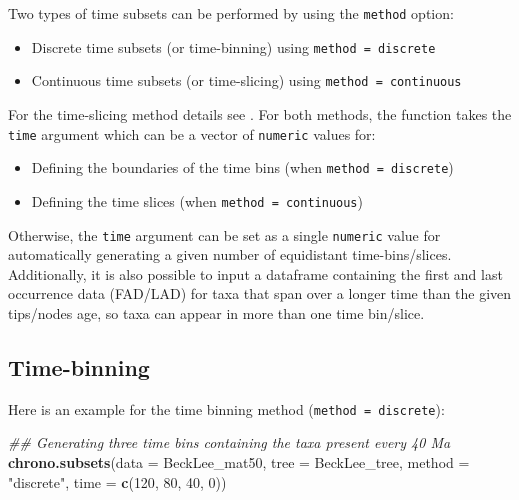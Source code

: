 \documentclass[]{book}
\newenvironment{Shaded}{\begin{snugshade}}{\end{snugshade}}
\newcommand{\CommentTok}[1]{\textcolor[rgb]{0.56,0.35,0.01}{\textit{#1}}}
\newcommand{\DataTypeTok}[1]{\textcolor[rgb]{0.13,0.29,0.53}{#1}}
\newcommand{\DecValTok}[1]{\textcolor[rgb]{0.00,0.00,0.81}{#1}}
\newcommand{\KeywordTok}[1]{\textcolor[rgb]{0.13,0.29,0.53}{\textbf{#1}}}
\newcommand{\NormalTok}[1]{#1}
\newcommand{\StringTok}[1]{\textcolor[rgb]{0.31,0.60,0.02}{#1}}
\providecommand{\tightlist}{%
  \setlength{\itemsep}{0pt}\setlength{\parskip}{0pt}}
\begin{document}
Two types of time subsets can be performed by using the \texttt{method} option:

\begin{itemize}
\tightlist
\item
  Discrete time subsets (or time-binning) using \texttt{method\ =\ discrete}
\item
  Continuous time subsets (or time-slicing) using \texttt{method\ =\ continuous}
\end{itemize}

For the time-slicing method details see \citet{time-slice}.
For both methods, the function takes the \texttt{time} argument which can be a vector of \texttt{numeric} values for:

\begin{itemize}
\tightlist
\item
  Defining the boundaries of the time bins (when \texttt{method\ =\ discrete})
\item
  Defining the time slices (when \texttt{method\ =\ continuous})
\end{itemize}

Otherwise, the \texttt{time} argument can be set as a single \texttt{numeric} value for automatically generating a given number of equidistant time-bins/slices.
Additionally, it is also possible to input a dataframe containing the first and last occurrence data (FAD/LAD) for taxa that span over a longer time than the given tips/nodes age, so taxa can appear in more than one time bin/slice.

\hypertarget{time-binning}{%
\subsection{Time-binning}\label{time-binning}}

Here is an example for the time binning method (\texttt{method\ =\ discrete}):

\begin{Shaded}
\begin{Highlighting}[]
\CommentTok{## Generating three time bins containing the taxa present every 40 Ma}
\KeywordTok{chrono.subsets}\NormalTok{(}\DataTypeTok{data =}\NormalTok{ BeckLee_mat50, }\DataTypeTok{tree =}\NormalTok{ BeckLee_tree,}
               \DataTypeTok{method =} \StringTok{"discrete"}\NormalTok{,}
               \DataTypeTok{time =} \KeywordTok{c}\NormalTok{(}\DecValTok{120}\NormalTok{, }\DecValTok{80}\NormalTok{, }\DecValTok{40}\NormalTok{, }\DecValTok{0}\NormalTok{))}
\end{Highlighting}
\end{Shaded}
\end{document}
